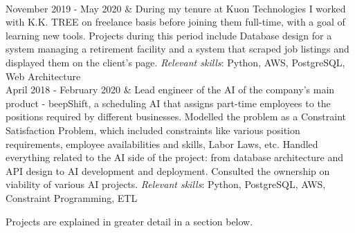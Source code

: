 \documentclass[]{cv-roald}
\begin{document}
\begin{tabularcv}
                    \\[\vspacepar]
   November 2019 - May 2020   & 
                    \newline During my tenure at Kuon Technologies I worked with K.K. TREE on freelance basis before joining them full-time, with a goal of learning new tools. Projects during this period include Database design for a system managing a retirement facility and a system that scraped job listings and displayed them on the client's page.
                    \newline \textit{Relevant skills}: Python, AWS, PostgreSQL, Web Architecture
                    \\[\vspacepar]
   April 2018 - February 2020       &   
                    \newline Lead engineer of the AI of the company's main product - beepShift, a scheduling AI that assigns part-time employees to the positions required by different businesses. Modelled the problem as a Constraint Satisfaction Problem, which included constraints like various position requirements, employee availabilities and skills, Labor Laws, etc.
                    \newline Handled everything related to the AI side of the project: from database architecture and API design to AI development and deployment.
                    \newline Consulted the ownership on viability of various AI projects.
                    \newline \textit{Relevant skills}: Python, PostgreSQL, AWS, Constraint Programming, ETL
\end{tabularcv}

Projects are explained in greater detail in a section below.
\end{document}
